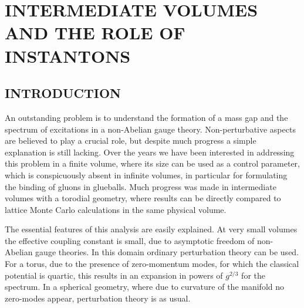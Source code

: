 \documentclass[12pt]{book}
\newcommand{\site}[1]{\refnote{\cite{#1}}}
\begin{document}
\chapter{INTERMEDIATE VOLUMES AND THE ROLE OF INSTANTONS}

\author{Pierre van Baal}


\section{INTRODUCTION}
An outstanding problem is to understand the formation of a mass gap and 
the spectrum of excitations in a non-Abelian gauge theory. Non-perturbative
aspects are believed to play a crucial role, but despite much progress a 
simple explanation is still lacking. Over the years we have been interested
in addressing this problem in a finite volume, where its size can be used
as a control parameter, which is conspicuously absent in infinite volumes, 
in particular for formulating the binding of gluons in glueballs. Much 
progress was made in intermediate volumes with a torodial geometry, where 
results can be directly compared to lattice Monte Carlo calculations in the 
same physical volume\site{vba1}.

The essential features of this analysis are easily explained. At very small
volumes the effective coupling constant is small, due to asymptotic freedom
of non-Abelian gauge theories. In this domain ordinary perturbation theory
can be used. For a torus, due to the presence of zero-momentum modes, for 
which the classical potential is quartic, this results in an expansion in 
powers of $g^{2/3}$ for the spectrum\site{lues}. In a spherical geometry, 
where due to curvature of the manifold no zero-modes appear, perturbation 
theory is as usual\site{vbda}.
\end{document}
